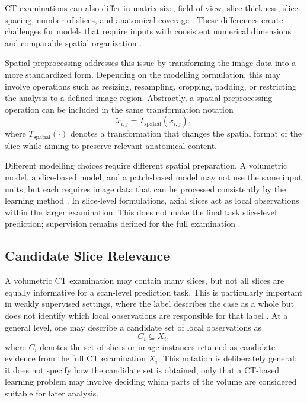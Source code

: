 CT examinations can also differ in matrix size, field of view, slice thickness, slice spacing, number of slices, and anatomical coverage \cite{rizzo2018radiomics}. These differences create challenges for models that require inputs with consistent numerical dimensions and comparable spatial organization \cite{litjens2017survey}.

Spatial preprocessing addresses this issue by transforming the image data into a more standardized form. Depending on the modelling formulation, this may involve operations such as resizing, resampling, cropping, padding, or restricting the analysis to a defined image region. Abstractly, a spatial preprocessing operation can be included in the same transformation notation
\[
\tilde{x}_{i,j} = T_{\mathrm{spatial}}(x_{i,j}),
\]
where \(T_{\mathrm{spatial}}(\cdot)\) denotes a transformation that changes the spatial format of the slice while aiming to preserve relevant anatomical content.

Different modelling choices require different spatial preparation. A volumetric model, a slice-based model, and a patch-based model may not use the same input units, but each requires image data that can be processed consistently by the learning method \cite{wang2023twoseventyfive}. In slice-level formulations, axial slices act as local observations within the larger examination. This does not make the final task slice-level prediction; supervision remains defined for the full examination \cite{ren2023weakly,xue2023copdmil}.

\subsection{Candidate Slice Relevance}
\label{sec:candidate_slice_relevance}

A volumetric CT examination may contain many slices, but not all slices are equally informative for a scan-level prediction task. This is particularly important in weakly supervised settings, where the label describes the case as a whole but does not identify which local observations are responsible for that label \cite{ren2023weakly}. At a general level, one may describe a candidate set of local observations as
\[
C_i \subseteq X_i,
\]
where \(C_i\) denotes the set of slices or image instances retained as candidate evidence from the full CT examination \(X_i\). This notation is deliberately general: it does not specify how the candidate set is obtained, only that a CT-based learning problem may involve deciding which parts of the volume are considered suitable for later analysis.

